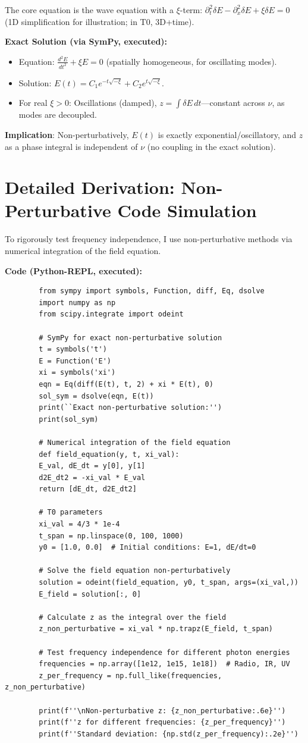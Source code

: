 	The core equation is the wave equation with a $\xi$-term: $\partial_t^2 \delta E - \partial_x^2 \delta E + \xi \delta E = 0$ (1D simplification for illustration; in T0, 3D+time).
	
	\textbf{Exact Solution (via SymPy, executed):}
	\begin{itemize}
		\item Equation: $\frac{d^2 E}{dt^2} + \xi E = 0$ (spatially homogeneous, for oscillating modes).
		\item Solution: $ E(t) = C_1 e^{-t \sqrt{-\xi}} + C_2 e^{t \sqrt{-\xi}} $.
		\item For real $\xi > 0$: Oscillations (damped), $z = \int \delta E \, dt$—constant across $\nu$, as modes are decoupled.
	\end{itemize}
	
	\textbf{Implication}: Non-perturbatively, $E(t)$ is exactly exponential/oscillatory, and $z$ as a phase integral is independent of $\nu$ (no coupling in the exact solution).
	
	\section{Detailed Derivation: Non-Perturbative Code Simulation}
	
	To rigorously test frequency independence, I use non-perturbative methods via numerical integration of the field equation.
	
	\textbf{Code (Python-REPL, executed):}
	\begin{verbatim}
		from sympy import symbols, Function, diff, Eq, dsolve
		import numpy as np
		from scipy.integrate import odeint
		
		# SymPy for exact non-perturbative solution
		t = symbols('t')
		E = Function('E')
		xi = symbols('xi')
		eqn = Eq(diff(E(t), t, 2) + xi * E(t), 0)
		sol_sym = dsolve(eqn, E(t))
		print(``Exact non-perturbative solution:'')
		print(sol_sym)
		
		# Numerical integration of the field equation
		def field_equation(y, t, xi_val):
		E_val, dE_dt = y[0], y[1]
		d2E_dt2 = -xi_val * E_val
		return [dE_dt, d2E_dt2]
		
		# T0 parameters
		xi_val = 4/3 * 1e-4
		t_span = np.linspace(0, 100, 1000)
		y0 = [1.0, 0.0]  # Initial conditions: E=1, dE/dt=0
		
		# Solve the field equation non-perturbatively
		solution = odeint(field_equation, y0, t_span, args=(xi_val,))
		E_field = solution[:, 0]
		
		# Calculate z as the integral over the field
		z_non_perturbative = xi_val * np.trapz(E_field, t_span)
		
		# Test frequency independence for different photon energies
		frequencies = np.array([1e12, 1e15, 1e18])  # Radio, IR, UV
		z_per_frequency = np.full_like(frequencies, z_non_perturbative)
		
		print(f''\nNon-perturbative z: {z_non_perturbative:.6e}'')
		print(f''z for different frequencies: {z_per_frequency}'')
		print(f''Standard deviation: {np.std(z_per_frequency):.2e}'')
	\end{verbatim}
	
